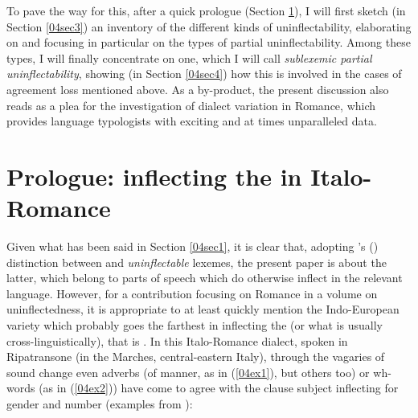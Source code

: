 \documentclass[output=paper,colorlinks,citecolor=brown]{langscibook}
\begin{document}
To pave the way for this, after a quick prologue (Section \ref{04sec2}), I will first sketch (in Section \ref{04sec3}) an inventory of the different kinds of uninflectability, elaborating on \citet{spencer2020} and focusing in particular on the types of partial uninflectability. Among these types, I will finally concentrate on one, which I will call \textit{sublexemic partial uninflectability}, showing (in Section \ref{04sec4}) how this is involved in the cases of agreement loss mentioned above. As a by-product, the present discussion also reads as a plea for the investigation of dialect variation in Romance, which provides language typologists with exciting and at times unparalleled data.

\section{Prologue: inflecting the  in Italo-Romance} \label{04sec2}

Given what has been said in Section \ref{04sec1}, it is clear that, adopting \citeauthor{spencer2020}'s (\citeyear[143]{spencer2020}) distinction between \emph{} and \emph{uninflectable} lexemes, the present paper is about the latter, which belong to parts of speech which do otherwise inflect in the relevant language. However, for a contribution focusing on Romance in a volume on uninflectedness, it is appropriate to at least quickly mention the Indo-European variety which probably goes the farthest in inflecting the  (or what is usually  cross-linguistically), that is . In this Italo-Romance dialect, spoken in Ripatransone (in the Marches, central-eastern Italy), through the vagaries of sound change even adverbs (of manner, as in (\ref{04ex1}), but others too) or wh-words (as in (\ref{04ex2})) have come to agree with the clause subject inflecting for gender and number (examples from \citealt{paciaroniloporcaro2018}):

\end{document}
